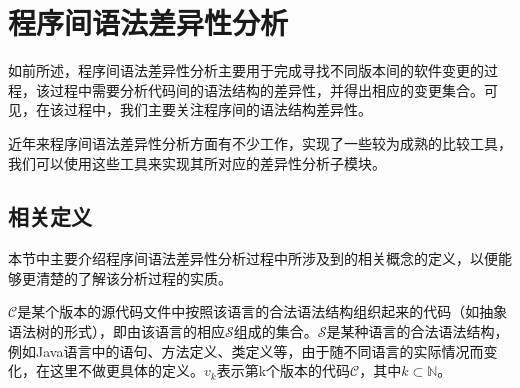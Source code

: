 %
%
%
%
%

\section{程序间语法差异性分析}
\label {chap_diff}

如前所述，程序间语法差异性分析主要用于完成寻找不同版本间的软件变更的过程，该过程中需要分析代码间的语法结构的差异性，并得出相应的变更集合。可见，在该过程中，我们主要关注程序间的语法结构差异性。


%
近年来程序间语法差异性分析方面有不少工作，实现了一些较为成熟的比较工具，我们可以使用这些工具来实现其所对应的差异性分析子模块。

\subsection{相关定义}

本节中主要介绍程序间语法差异性分析过程中所涉及到的相关概念的定义，以便能够更清楚的了解该分析过程的实质。

$\mathcal{C}$是某个版本的源代码文件中按照该语言的合法语法结构组织起来的代码（如抽象语法树的形式），即由该语言的相应$\mathcal{S}$组成的集合。$\mathcal{S}$是某种语言的合法语法结构，例如Java语言中的语句、方法定义、类定义等，由于随不同语言的实际情况而变化，在这里不做更具体的定义。$v_k$表示第k个版本的代码$\mathcal{C}$，其中$k \subset \mathbb{N}$。

